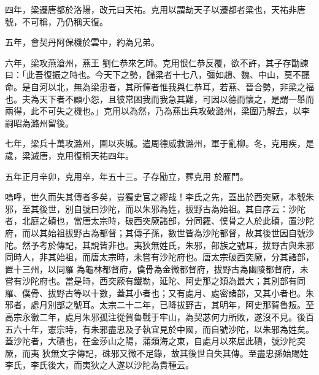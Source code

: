 \begin{pinyinscope}
 四年，梁遷唐都於洛陽，改元曰天祐。克用以謂劫天子以遷都者梁也，天祐非唐號，不可稱，乃仍稱天復。



 五年，會契丹阿保機於雲中，約為兄弟。



 六年，梁攻燕滄州，燕王
 劉仁恭來乞師。克用恨仁恭反覆，欲不許，其子存勖諫曰：「此吾復振之時也。今天下之勢，歸梁者十七八，彊如趙、魏、中山，莫不聽命。是自河以北，無為梁患者，其所憚者惟我與仁恭耳，若燕、晉合勢，非梁之福也。夫為天下者不顧小怨，且彼常困我而我急其難，可因以德而懷之，是謂一舉而兩得，此不可失之機也。」克用以為然，乃為燕出兵攻破潞州，梁圍乃解去，以李嗣昭為潞州留後。



 七年，梁兵十萬攻潞州，圍以夾城。遣周德威救潞州，軍于亂柳。冬，克用疾，是歲，梁滅唐，克用復稱天祐四年。



 五年正月辛卯，克用卒，年五十三。子存勖立，葬克用
 於雁門。



 嗚呼，世久而失其傳者多矣，豈獨史官之繆哉！李氏之先，蓋出於西突厥，本號朱邪，至其後世，別自號曰沙陀，而以朱邪為姓，拔野古為始祖。其自序云：沙陀者，北庭之磧也，當唐太宗時，破西突厥諸部，分同羅、僕骨之人於此磧，置沙陀府，而以其始祖拔野古為都督；其傳子孫，數世皆為沙陀都督，故其後世因自號沙陀。然予考於傳記，其說皆非也。夷狄無姓氏，朱邪，部族之號耳，拔野古與朱邪同時人，非其始祖，而唐太宗時，未嘗有沙陀府也。唐太宗破西突厥，分其諸部，置十三州，以同羅
 為龜林都督府，僕骨為金微都督府，拔野古為幽陵都督府，未嘗有沙陀府也。當是時，西突厥有鐵勒，延陀、阿史那之類為最大；其別部有同羅、僕骨、拔野古等以十數，蓋其小者也；又有處月、處密諸部，又其小者也。朱邪者，處月別部之號耳。太宗二十二年，已降拔野古，其明年，阿史那賀魯叛。至高宗永徽二年，處月朱邪孤注從賀魯戰于牢山，為契苾何力所敗，遂沒不見。後百五六十年，憲宗時，有朱邪盡忠及子執宜見於中國，而自號沙陀，以朱邪為姓矣。蓋沙陀者，大磧也，在金莎山之陽，蒲類海之東，自處月以來居此磧，號沙陀突厥，而夷
 狄無文字傳記，硃邪又微不足錄，故其後世自失其傳。至盡忠孫始賜姓李氏，李氏後大，而夷狄之人遂以沙陀為貴種云。



\end{pinyinscope}